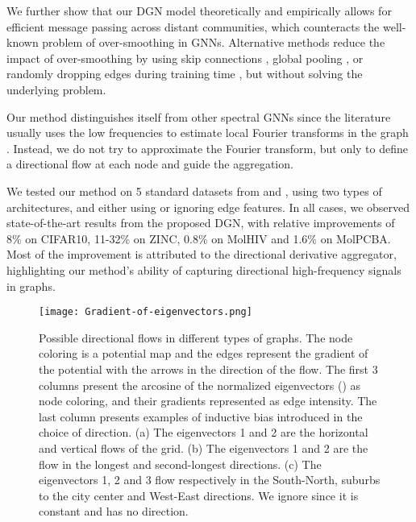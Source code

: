 \documentclass{article} \usepackage{arxiv,times}
\begin{document}
We further show that our DGN model theoretically and empirically allows for efficient message passing across distant communities, which counteracts the well-known problem of over-smoothing in GNNs. Alternative methods reduce the impact of over-smoothing by using skip connections \cite{luan2019break}, global pooling \cite{alon_bottleneck_2020}, or randomly dropping edges during training time \cite{rong_dropedge_2020}, but without solving the underlying problem. 

Our method distinguishes itself from other spectral GNNs since the literature usually uses the low frequencies to estimate local Fourier transforms in the graph \cite{levie_cayleynets_2018, xu_graph_2019}. Instead, we do not try to approximate the Fourier transform, but only to define a directional flow at each node and guide the aggregation.


We tested our method on 5 standard datasets from \cite{dwivedi2020benchmarking} and \cite{hu2020open}, using two types of architectures, and either using or ignoring edge features. In all cases, we observed state-of-the-art results from the proposed DGN, with relative improvements of 8\% on CIFAR10, 11-32\% on ZINC, 0.8\% on MolHIV and 1.6\% on MolPCBA. Most of the improvement is attributed to the directional derivative aggregator, highlighting our method's ability of capturing directional high-frequency signals in graphs.





\begin{figure*}[ht]
\centering
 \texttt{[image: Gradient-of-eigenvectors.png]}
 \vspace{-5pt}
 \caption{Possible directional flows in different types of graphs. The node coloring is a potential map and the edges represent the gradient of the potential with the arrows in the direction of the flow. The first 3 columns present the arcosine of the normalized eigenvectors () as node coloring, and their gradients represented as edge intensity. The last column presents examples of inductive bias introduced in the choice of direction. (a) The eigenvectors 1 and 2 are the horizontal and vertical flows of the grid. (b) The eigenvectors 1 and 2 are the flow in the longest and second-longest directions. (c) The eigenvectors 1, 2 and 3 flow respectively in the South-North, suburbs to the city center and West-East directions. We ignore  since it is constant and has no direction.} 
\label{fig:eig_vec_grad}
\end{figure*}
\end{document}
